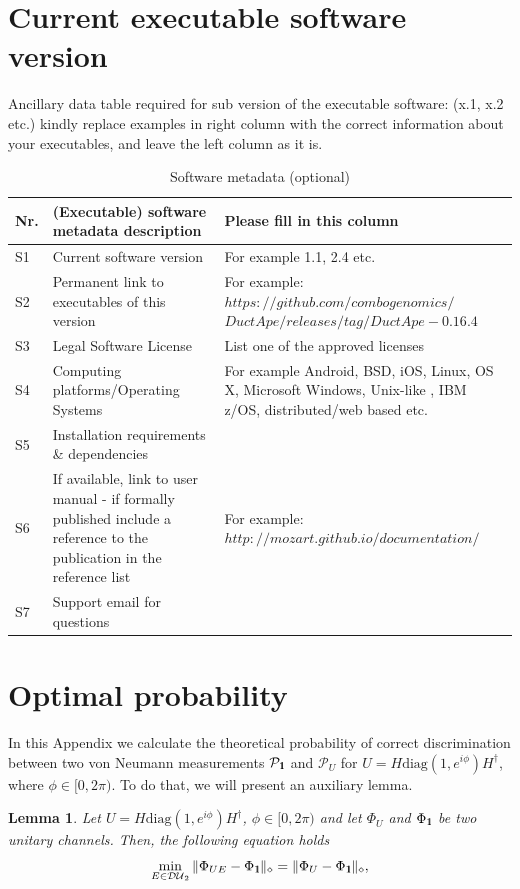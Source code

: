 \documentclass[preprint,12pt, a4paper]{elsarticle}
\newcommand{\1}{{\rm 1\hspace{-0.9mm}l}}
\newcommand{\Id}{{\rm 1\hspace{-0.9mm}l}}
\newcommand{\PP}{\mathcal{P}}
\newcommand{\diaguni}{\ensuremath{\mathcal{DU}}}
\newcommand{\diag}{\mathrm{diag}}
\newtheorem{lemma}{Lemma}
\begin{document}

\section*{Current executable software version}
\label{}

Ancillary data table required for sub version of the executable software: (x.1, 
x.2 etc.) kindly replace examples in right column with the correct information 
about your executables, and leave the left column as it is.

\begin{table}[!h]
\begin{tabular}{|l|p{6.5cm}|p{6.5cm}|}
\hline
\textbf{Nr.} & \textbf{(Executable) software metadata description} & 
\textbf{Please fill in this column} \\
\hline
S1 & Current software version & For example 1.1, 2.4 etc. \\
\hline
S2 & Permanent link to executables of this version  & For example: 
$https://github.com/combogenomics/$ $DuctApe/releases/tag/DuctApe-0.16.4$ \\
\hline
S3 & Legal Software License & List one of the approved licenses \\
\hline
S4 & Computing platforms/Operating Systems & For example Android, BSD, iOS, 
Linux, OS X, Microsoft Windows, Unix-like , IBM z/OS, distributed/web based 
etc. \\
\hline
S5 & Installation requirements \& dependencies & \\
\hline
S6 & If available, link to user manual - if formally published include a 
reference to the publication in the reference list & For example: 
$http://mozart.github.io/documentation/$ \\
\hline
S7 & Support email for questions & \\
\hline
\end{tabular}
\caption{Software metadata (optional)}
\label{} 
\end{table}

\appendix
\section{Optimal probability}

In this Appendix we calculate the theoretical probability of correct discrimination between two von Neumann measurements $\PP_\1$ and $\PP_U$ for $U = H \diag(1, e^{i \phi}) H^\dagger$, where  $\phi \in [0, 2\pi)$.  To do that, we will present an auxiliary lemma.   
\begin{lemma}\label{lemma:min-e-optimal}
	Let $U = H \diag(1, e^{i \phi}) H^\dagger$, $\phi \in [0, 2\pi)$ and	let 
	$\Phi_U$ and $\Phi_\Id$ be two unitary channels. Then, the following equation holds 
	\begin{equation}
	\min_{E \in \diaguni_2} \|\Phi_{UE} - 
	\Phi_\Id\|_\diamond = \|\Phi_{U} - 
	\Phi_\Id\|_\diamond,
	\end{equation}
\end{lemma}
\end{document}
